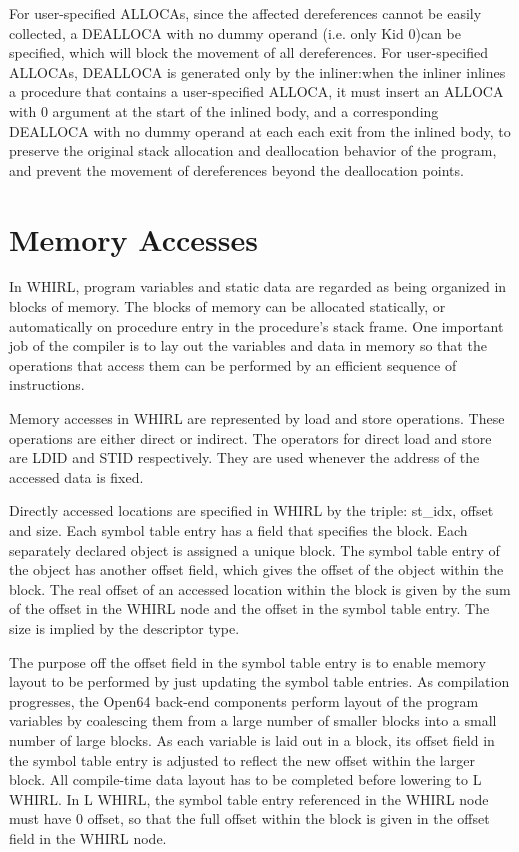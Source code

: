 \documentclass{article}
\begin{document}
\begin{itemize}
For user-specified
%
ALLOCAs, since the affected dereferences cannot
be easily collected, a
%
DEALLOCA with no dummy operand (i.e. only Kid 0)can be specified,
which will block the movement of all dereferences. For
user-specified
%
ALLOCAs,
%
DEALLOCA is generated only by the inliner:when
the inliner inlines a procedure that contains a user-specified
%
ALLOCA, it must insert an
%
ALLOCA with 0 argument at the start of
the inlined body, and a corresponding
%
DEALLOCA with no dummy operand at each
each exit from the inlined body, to preserve the original stack
allocation and deallocation behavior of the program, and prevent
the movement of dereferences beyond the deallocation points.

\end{itemize}
\section{Memory Accesses}

In WHIRL, program variables and static data are regarded as being
organized in blocks of memory. The blocks of memory can be allocated
statically, or automatically on procedure entry in the procedure's
stack frame. One important job of the compiler is to lay out the
variables and data in memory so that the operations that access
them can be performed by an efficient sequence of instructions.

Memory accesses in WHIRL are represented by load and store operations.
These operations are either direct or indirect. The operators for
direct load and store are
%
LDID and
%
STID respectively. They are
used whenever the address of the accessed data is fixed.

Directly accessed locations are specified in WHIRL by the 
triple: st\_idx, offset and size. Each symbol table entry has a field that
specifies the block. Each separately declared object is assigned
a unique block. The symbol table entry of the object has another
offset field, which gives the offset of the object within the block.
The real offset of an accessed location within the block is given
by the sum of the offset in the WHIRL node and the offset in the
symbol table entry. The size is implied by the descriptor type.

The purpose off the offset field in the symbol table entry is to
enable memory layout to be performed by just updating the symbol
table entries. As compilation progresses, the Open64 back-end
components perform layout of the program variables by coalescing
them from a large number of smaller blocks into a small number of
large blocks. As each variable is laid out in a block, its offset
field in the symbol table entry is adjusted to reflect the new
offset within the larger block. All compile-time data layout has
to be completed before lowering to L WHIRL. In L WHIRL, the symbol
table entry referenced in the WHIRL node must have 0 offset, so that
the full offset within the block is given in the offset field in
the WHIRL node. 
\end{document}
